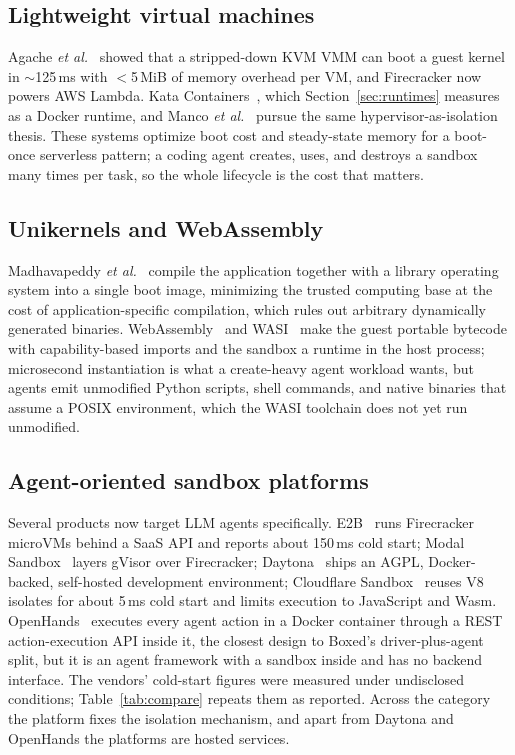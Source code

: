 \documentclass[conference]{IEEEtran}
\begin{document}
\subsection{Lightweight virtual machines}
Agache \emph{et al.}~\cite{firecracker} showed that a stripped-down KVM
VMM can boot a guest kernel in $\sim$125\,ms with $<$5\,MiB of memory
overhead per VM, and Firecracker now powers AWS Lambda. Kata
Containers~\cite{kata}, which Section~\ref{sec:runtimes} measures as a
Docker runtime, and Manco \emph{et al.}~\cite{my-vm-is-lighter} pursue the
same hypervisor-as-isolation thesis. These systems optimize boot cost and
steady-state memory for a boot-once serverless pattern; a coding agent
creates, uses, and destroys a sandbox many times per task, so the whole
lifecycle is the cost that matters.

\subsection{Unikernels and WebAssembly}
Madhavapeddy \emph{et al.}~\cite{unikernel} compile the application together
with a library operating system into a single boot image, minimizing the
trusted computing base at the cost of application-specific compilation, which
rules out arbitrary dynamically generated binaries. WebAssembly~\cite{wasm}
and WASI~\cite{wasi} make the guest portable bytecode with capability-based
imports and the sandbox a runtime in the host process; microsecond
instantiation is what a create-heavy agent workload wants, but agents emit
unmodified Python scripts, shell commands, and native binaries that assume a
POSIX environment, which the WASI toolchain does not yet run unmodified.

\subsection{Agent-oriented sandbox platforms}
Several products now target LLM agents specifically. E2B~\cite{e2b} runs
Firecracker microVMs behind a SaaS API and reports about 150\,ms cold start;
Modal Sandbox~\cite{modal} layers gVisor over Firecracker;
Daytona~\cite{daytona} ships an AGPL, Docker-backed, self-hosted development
environment; Cloudflare Sandbox~\cite{cfsandbox} reuses V8 isolates for
about 5\,ms cold start and limits execution to JavaScript and Wasm.
OpenHands~\cite{openhands} executes every agent action in a Docker container
through a REST action-execution API inside it, the closest design to Boxed's
driver-plus-agent split, but it is an agent framework with a sandbox inside
and has no backend interface. The vendors' cold-start figures were measured
under undisclosed conditions; Table~\ref{tab:compare} repeats them as
reported. Across the category the platform fixes the isolation mechanism,
and apart from Daytona and OpenHands the platforms are hosted services.
\end{document}
